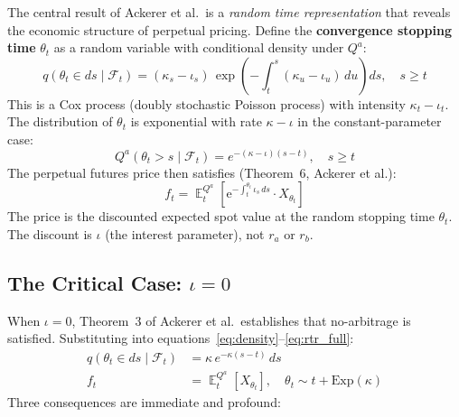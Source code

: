 \documentclass[10pt,twocolumn]{article}
\theoremstyle{plain}
\theoremstyle{definition}
\DeclareMathOperator{\E}{\mathbb{E}}
\newcommand{\Qa}{Q^a}
\newcommand{\F}{\mathcal{F}}
\begin{document}
The central result of Ackerer et al.\ is a \textit{random time
representation} that reveals the economic structure of perpetual
pricing. Define the \textbf{convergence stopping time} $\theta_t$
as a random variable with conditional density under $\Qa$:
\begin{equation}
q(\theta_t \in ds \mid \F_t)
= (\kappa_s - \iota_s)\,
\exp\!\left(-\int_t^s (\kappa_u - \iota_u)\,du\right)ds, \quad s\geq t
\label{eq:density}
\end{equation}
This is a Cox process (doubly stochastic Poisson process) with
intensity $\kappa_t - \iota_t$. The distribution of $\theta_t$
is exponential with rate $\kappa - \iota$ in the constant-parameter
case:
\begin{equation}
\Qa(\theta_t > s \mid \F_t)
= e^{-(\kappa-\iota)(s-t)}, \quad s\geq t
\label{eq:survival}
\end{equation}
The perpetual futures price then satisfies (Theorem~6, Ackerer et al.):
\begin{equation}
f_t = \E^{\Qa}_t\!\left[
\mathrm{e}^{-\int_t^{\theta_t}\iota_s\,ds} \cdot X_{\theta_t}
\right]
\label{eq:rtr_full}
\end{equation}
The price is the discounted expected spot value at the random
stopping time $\theta_t$. The discount is $\iota$ (the interest
parameter), not $r_a$ or $r_b$.

\subsection{The Critical Case: $\iota = 0$}
\label{sec:iota_zero}

When $\iota = 0$, Theorem~3 of Ackerer et al.\ establishes that
no-arbitrage is satisfied. Substituting into
equations~\eqref{eq:density}--\eqref{eq:rtr_full}:
\begin{align}
q(\theta_t \in ds \mid \F_t) &= \kappa\,e^{-\kappa(s-t)}\,ds
\label{eq:density_zero}\\[4pt]
f_t &= \E^{\Qa}_t[X_{\theta_t}],
\quad \theta_t \sim t + \mathrm{Exp}(\kappa)
\label{eq:perp_iota_zero}
\end{align}
Three consequences are immediate and profound:
\end{document}
